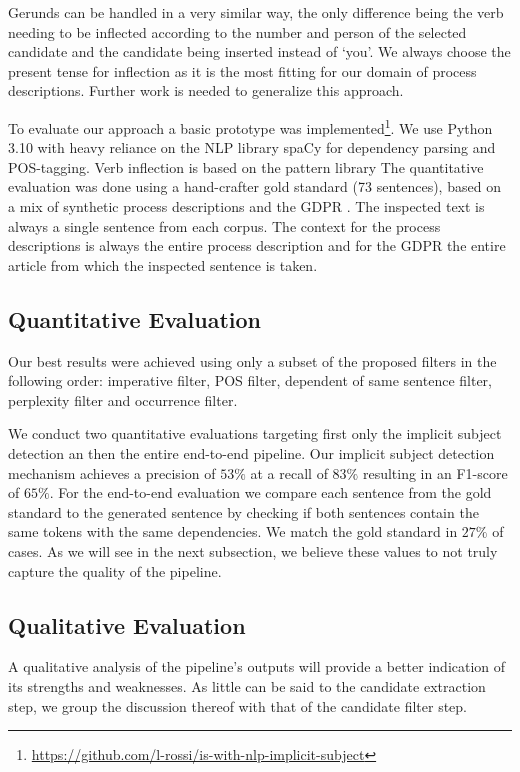 \documentclass[times, 10pt,twocolumn]{article}
\begin{document}
Gerunds can be handled in a very similar way, the only difference being the verb needing to be
inflected according to the number and person of the selected candidate and the candidate being
inserted instead of `you'. We always choose
the present tense for inflection as it is the most fitting for our domain of process descriptions.
Further work is needed to generalize this approach.



To evaluate our approach a basic prototype was implemented\footnote{\url{https://github.com/l-rossi/is-with-nlp-implicit-subject}}.
We use Python 3.10 \cite{python} with heavy reliance on the NLP library 
spaCy \cite{spacy} for dependency parsing and POS-tagging. Verb inflection
is based on the pattern library \cite{pattern_library}
The quantitative evaluation was done using a hand-crafter gold standard (73 sentences),
based on a mix of synthetic process descriptions \cite{NLP_bpm_data} and the GDPR \cite{gdpr}.
The inspected text is always a single sentence from each corpus. The context for the process descriptions
is always the entire process description and for the GDPR the entire article from which the inspected sentence
is taken.

\subsection{Quantitative Evaluation}
Our best results were achieved using only a subset of the proposed filters in the following order:
imperative filter, POS filter, dependent of same sentence filter, perplexity filter and occurrence filter.

We conduct two quantitative evaluations targeting first only the implicit subject detection an then
the entire end-to-end pipeline. 
Our implicit subject detection mechanism achieves a precision of \(53\%\) at a recall of \(83\%\)
resulting in an F1-score of \(65\%\).
For the end-to-end evaluation we compare each sentence from the gold standard to the generated sentence
by checking if both sentences contain the same tokens with the same dependencies. We match the gold
standard in \(27\%\) of cases.
As we will see in the next subsection, we believe these values to not truly capture the quality
of the pipeline. 

\subsection{Qualitative Evaluation}
A qualitative analysis of the pipeline's outputs will provide a better indication of its strengths
and weaknesses. As little can be said to the candidate extraction step, we group the discussion
thereof with that of the candidate filter step.
\end{document}
